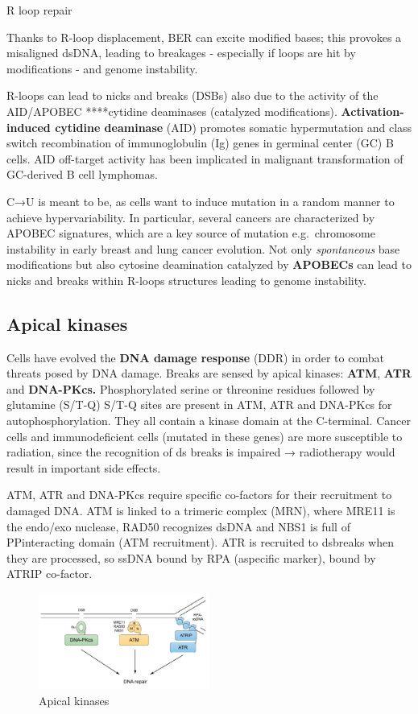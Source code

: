 R loop repair

Thanks to R-loop displacement, BER can excite modified bases; this provokes a misaligned dsDNA, leading to breakages - especially if loops are hit by modifications - and genome instability.

R-loops can lead to nicks and breaks (DSBs) also due to the activity of the AID/APOBEC ****cytidine deaminases (catalyzed modifications). \textbf{Activation-induced cytidine deaminase} (AID) promotes somatic hypermutation and class switch recombination of immunoglobulin (Ig) genes in germinal center (GC) B cells. AID off-target activity has been implicated in malignant transformation of GC-derived B cell lymphomas.

C→U is meant to be, as cells want to induce mutation in a random manner to achieve hypervariability. In particular, several cancers are characterized by APOBEC signatures, which are a key source of mutation e.g.~chromosome instability in early breast and lung cancer evolution. Not only \emph{spontaneous} base modifications but also cytosine deamination catalyzed by \textbf{APOBECs} can lead to nicks and breaks within R-loops structures leading to genome instability.

\hypertarget{apical-kinases}{%
\subsection{Apical kinases}\label{apical-kinases}}

Cells have evolved the \textbf{DNA damage response} (DDR) in order to combat threats
posed by DNA damage. Breaks are sensed by apical kinases: \textbf{ATM}, \textbf{ATR} and \textbf{DNA-PKcs.} Phosphorylated serine or threonine residues followed by glutamine (S/T-Q) S/T-Q sites are present in ATM, ATR and DNA-PKcs for autophosphorylation. They all contain a kinase domain at the C-terminal. Cancer cells and immunodeficient cells (mutated in these genes) are more susceptible to radiation, since the recognition of ds breaks is impaired → radiotherapy would result in important side effects.

ATM, ATR and DNA-PKcs require specific co-factors for their recruitment to
damaged DNA. ATM is linked to a trimeric complex (MRN), where MRE11 is the endo/exo nuclease, RAD50 recognizes dsDNA and NBS1 is full of PPinteracting domain (ATM recruitment). ATR is recruited to dsbreaks when they are processed, so ssDNA bound by RPA (aspecific marker), bound by ATRIP co-factor.

\begin{figure}
\centering
\includegraphics[width=0.5\textwidth]{../_resources/Screen_Shot_2022-11-30_at_09-11-05.png}
\caption{Apical kinases}
\end{figure}

